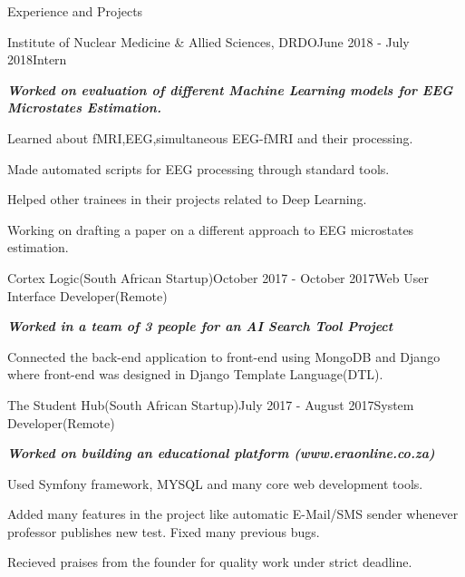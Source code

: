 \documentclass{resume} %
\begin{document}
\begin{rSection}{Experience and Projects}

\begin{rSubsection}{Institute of Nuclear Medicine \& Allied Sciences, DRDO}{June 2018 - July 2018}{Intern}{}
\item {\em \bf Worked on evaluation of different Machine Learning models for EEG Microstates Estimation.}
\item Learned about fMRI,EEG,simultaneous EEG-fMRI and their processing.
\item Made automated scripts for EEG processing through standard tools. 
\item Helped other trainees in their projects related to Deep Learning.
\item Working on drafting a paper on a different approach to EEG microstates estimation.
\end{rSubsection}

\bigskip
\begin{rSubsection}{Cortex Logic(South African Startup)}{October 2017 - October 2017}{Web User Interface Developer(Remote)}{}
\item {\em \bf Worked in a team of 3 people for an AI Search Tool Project}
\item Connected the back-end application to front-end using MongoDB and Django where front-end was designed in Django Template Language(DTL).
\end{rSubsection}


\begin{rSubsection}{The Student Hub(South African Startup)}{July 2017 - August 2017}{System Developer(Remote)}{}
	\item {\em \bf Worked on building an educational platform (www.eraonline.co.za)}
	\item Used Symfony framework, MYSQL and many core web development tools.
	\item Added many features in the project like automatic E-Mail/SMS sender
	whenever professor publishes new test. Fixed many previous bugs.
	\item Recieved praises from the founder for quality work under strict deadline.
\\	
\end{rSubsection}

\end{rSection}
\end{document}
